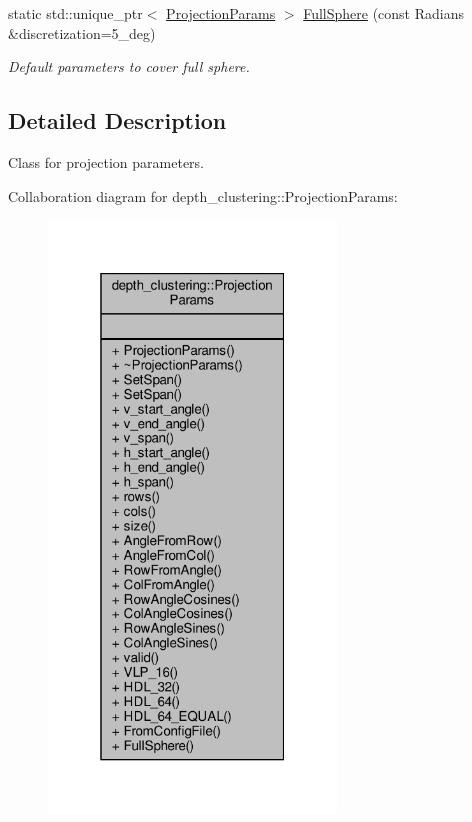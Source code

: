 \begin{DoxyCompactItemize}
static std\+::unique\+\_\+ptr$<$ \hyperlink{classdepth__clustering_1_1ProjectionParams}{Projection\+Params} $>$ \hyperlink{classdepth__clustering_1_1ProjectionParams_aa61906911995f0501dd03746b96d4c9c}{Full\+Sphere} (const Radians \&discretization=5\+\_\+deg)
\begin{DoxyCompactList}\small\item\em Default parameters to cover full sphere. \end{DoxyCompactList}\end{DoxyCompactItemize}


\subsection{Detailed Description}
Class for projection parameters. 

Collaboration diagram for depth\+\_\+clustering\+:\+:Projection\+Params\+:\nopagebreak
\begin{figure}[H]
\begin{center}
\leavevmode
\includegraphics[width=217pt]{classdepth__clustering_1_1ProjectionParams__coll__graph}
\end{center}
\end{figure}



